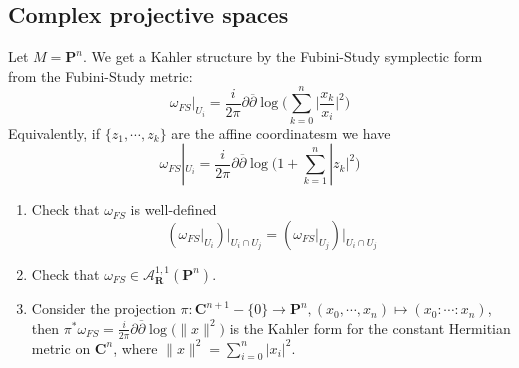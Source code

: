 \documentclass[
11pt, %
letterpaper， %
oneside, %
headinclude,footinclude, %
BCOR5mm, %
]{scrartcl}
\newcommand{\R}{{\mathbf{R}}}
\newcommand{\C}{{\mathbf{C}}}
\newcommand{\cp}{{\mathbf{P}}}
\begin{document}
\subsection{Complex projective spaces}
\begin{ex}
	Let $M=\cp^n$. We get a Kahler structure by the Fubini-Study symplectic form from the Fubini-Study metric:
	\begin{equation*}
	\omega_{FS}|_{U_i}=\frac{i}{2\pi}\partial \overline{\partial} \log \big(\sum_{k=0}^{n}\big|\frac{x_k}{x_i}\big|^2 \big)
	\end{equation*}
	Equivalently, if $\{z_1, \cdots, z_k\}$ are the affine coordinatesm we have 
		\begin{equation*}
	\omega_{FS}|_{U_i}=\frac{i}{2\pi}\partial \overline{\partial} \log \big(1+ \sum_{k=1}^{n}|z_k|^2 \big)
	\end{equation*}

\begin{exercise}
	\begin{enumerate}
		\item Check that $\omega_{FS}$ is well-defined
		\begin{equation*}
		(\omega_{FS}|_{U_i})\big|_{U_i\cap U_j}=(\omega_{FS}|_{U_j})\big|_{U_i\cap U_j}
		\end{equation*}
		\item Check that $\omega_{FS}\in \mathcal{A}^{1,1}_{\R}(\cp^n)$.
		\item Consider the projection $\pi: \C^{n+1}-\{0\}\to \cp^n, (x_0,\cdots, x_n)\mapsto (x_0:\cdots : x_n)$, then $\pi^*\omega_{FS}=\frac{i}{2\pi}\partial \overline{\partial} \log \big(\|x\|^2 \big)$ is the Kahler form for the constant Hermitian metric on $\C^n$, where $\|x\|^2= \sum_{i=0}^{n}|x_i|^2$.
	\end{enumerate}
\end{exercise}


\end{ex}
\end{document}
